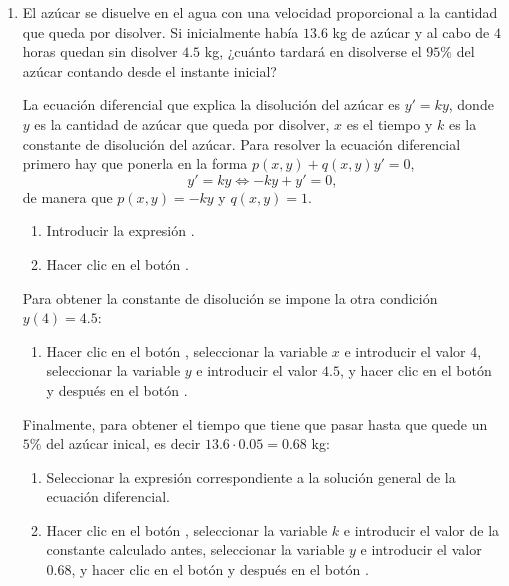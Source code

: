 \begin{enumerate}[leftmargin=*]
\item El azúcar se disuelve en el agua con una velocidad proporcional a la cantidad que queda por disolver.
Si inicialmente había $13.6$ kg de azúcar y al cabo de $4$ horas quedan sin disolver $4.5$ kg, ¿cuánto tardará en disolverse el $95\%$ del
azúcar contando desde el instante inicial?
\begin{indicacion}
La ecuación diferencial que explica la disolución del azúcar es $y'=ky$, donde $y$ es la cantidad de azúcar que queda
por disolver, $x$ es el tiempo y $k$ es la constante de disolución del azúcar. 
Para resolver la ecuación diferencial primero hay que ponerla en la forma $p(x,y)+q(x,y)y'=0$,
\[
y'=ky \Leftrightarrow -ky+y'=0,
\]
de manera que $p(x,y)=-ky$ y $q(x,y)=1$.
\begin{enumerate}
\item Introducir la expresión .
\item Hacer clic en el botón .
\end{enumerate}
Para obtener la constante de disolución se impone la otra condición $y(4)=4.5$:
\begin{enumerate}[resume]
\item Hacer clic en el botón , seleccionar la variable $x$ e introducir el valor $4$, seleccionar la
variable $y$ e introducir el valor $4.5$, y hacer clic en el botón  y después en el botón
.
\end{enumerate}
Finalmente, para obtener el tiempo que tiene que pasar hasta que quede un $5\%$ del azúcar inical, es decir $13.6\cdot
0.05=0.68$ kg:
\begin{enumerate}[resume]
\item Seleccionar la expresión correspondiente a la solución general de la ecuación diferencial.
\item Hacer clic en el botón , seleccionar la variable $k$ e introducir el valor de la constante calculado antes,
seleccionar la variable $y$ e introducir el valor $0.68$, y hacer clic en el botón  y después en el botón
.
\end{enumerate}
\end{indicacion}

\end{enumerate}


